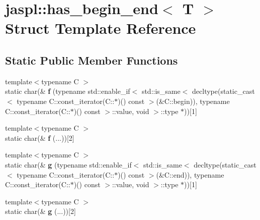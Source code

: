 \hypertarget{structjaspl_1_1has__begin__end}{}\section{jaspl\+:\+:has\+\_\+begin\+\_\+end$<$ T $>$ Struct Template Reference}
\label{structjaspl_1_1has__begin__end}
\subsection*{Static Public Member Functions}
\begin{DoxyCompactItemize}
\item 
{\footnotesize template$<$typename C $>$ }\\static char(\& {\bfseries f} (typename std\+::enable\+\_\+if$<$ std\+::is\+\_\+same$<$ decltype(static\+\_\+cast$<$ typename C\+::const\+\_\+iterator(C\+::$\ast$)() const  $>$(\&C\+::begin)), typename C\+::const\+\_\+iterator(C\+::$\ast$)() const  $>$\+::value, void $>$\+::type $\ast$))\mbox{[}1\mbox{]}\hypertarget{structjaspl_1_1has__begin__end_ada21a7ce698af913c3564df40dc89652}{}\label{structjaspl_1_1has__begin__end_ada21a7ce698af913c3564df40dc89652}

\item 
{\footnotesize template$<$typename C $>$ }\\static char(\& {\bfseries f} (...))\mbox{[}2\mbox{]}\hypertarget{structjaspl_1_1has__begin__end_a78807fa966c53f7ec2966588cf164038}{}\label{structjaspl_1_1has__begin__end_a78807fa966c53f7ec2966588cf164038}

\item 
{\footnotesize template$<$typename C $>$ }\\static char(\& {\bfseries g} (typename std\+::enable\+\_\+if$<$ std\+::is\+\_\+same$<$ decltype(static\+\_\+cast$<$ typename C\+::const\+\_\+iterator(C\+::$\ast$)() const  $>$(\&C\+::end)), typename C\+::const\+\_\+iterator(C\+::$\ast$)() const  $>$\+::value, void $>$\+::type $\ast$))\mbox{[}1\mbox{]}\hypertarget{structjaspl_1_1has__begin__end_ae073a73bfffe4143a11e49e9f46a362f}{}\label{structjaspl_1_1has__begin__end_ae073a73bfffe4143a11e49e9f46a362f}

\item 
{\footnotesize template$<$typename C $>$ }\\static char(\& {\bfseries g} (...))\mbox{[}2\mbox{]}\hypertarget{structjaspl_1_1has__begin__end_a4ab2cedf827f276646d35df9fd39d155}{}\label{structjaspl_1_1has__begin__end_a4ab2cedf827f276646d35df9fd39d155}

\end{DoxyCompactItemize}
